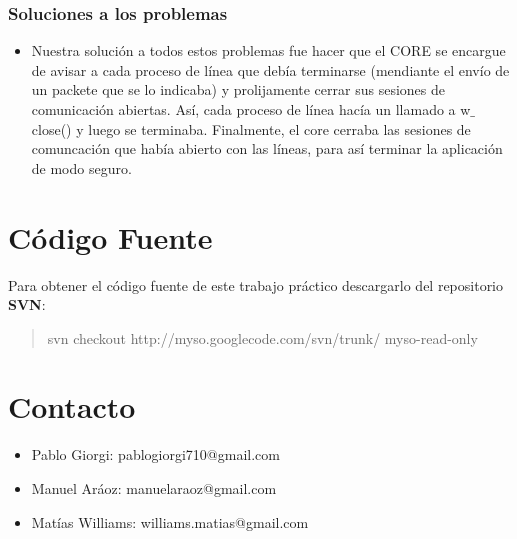 \documentclass[a4paper,10pt]{elsart}
\begin{document}
\subsubsection{Soluciones a los problemas}
\begin{itemize}
	\item Nuestra soluci\'on a todos estos problemas fue hacer que el CORE se encargue de avisar a cada proceso de l\'inea que deb\'ia terminarse (mendiante el env\'io de un packete que se lo indicaba) y prolijamente cerrar sus sesiones de comunicaci\'on abiertas. As\'i, cada proceso de l\'inea hac\'ia un llamado a w$\_$close() y luego se terminaba. Finalmente, el core cerraba las sesiones de comuncaci\'on que hab\'ia abierto con las l\'ineas, para as\'i terminar la aplicaci\'on de modo seguro.

\end{itemize}

\section{C\'odigo Fuente}
Para obtener el c\'odigo fuente de este trabajo pr\'actico descargarlo del repositorio \textbf{SVN}:\\
\begin{quote}
 svn checkout http://myso.googlecode.com/svn/trunk/ myso-read-only
\end{quote}

\section{Contacto}
\begin{itemize}
  \item Pablo Giorgi: pablogiorgi710@gmail.com
  \item Manuel Ar\'aoz: manuelaraoz@gmail.com
  \item Mat\'ias Williams: williams.matias@gmail.com
\end{itemize}
\end{document}
